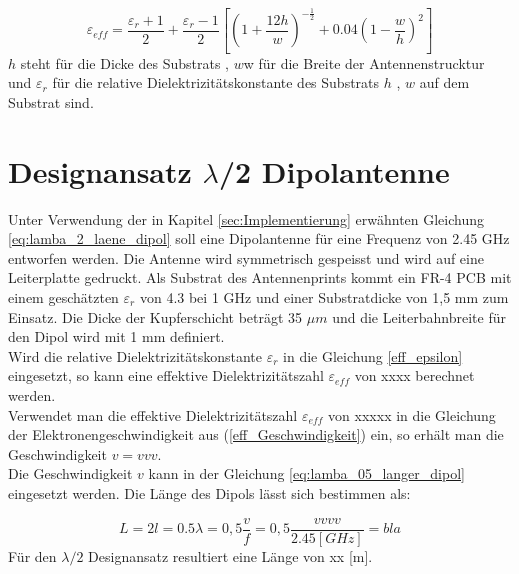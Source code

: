 \begin{equation}\label{eff_epsilon}
\varepsilon_{eff}=\dfrac{\varepsilon_r+1}{2}+\dfrac{\varepsilon_r-1}{2}\left[\left(1+\dfrac{12h}{w}\right)^{-\frac{1}{2}}+0.04\left(1-\dfrac{w}{h}\right)^{2}\right]
\end{equation}
$h$ steht für die Dicke des Substrats , $w$w für die Breite der Antennenstrucktur und  $\varepsilon_{r}$ für die relative Dielektrizitätskonstante des Substrats
$h$ , $w$  auf dem Substrat  sind. 

\section{Designansatz $\lambda$/2 Dipolantenne}  
Unter Verwendung der in Kapitel \ref{sec:Implementierung} erwähnten Gleichung \ref{eq:lamba_2_laene_dipol} soll eine Dipolantenne für eine Frequenz von 2.45 GHz entworfen werden. Die Antenne wird symmetrisch gespeisst und wird auf eine Leiterplatte gedruckt. Als Substrat des Antennenprints kommt ein  FR-4 PCB mit einem geschätzten  $\varepsilon_r $ von 4.3 bei 1 GHz und einer Substratdicke von 1,5 mm  zum Einsatz. Die Dicke der Kupferschicht beträgt 35 $\mu m$ und  die Leiterbahnbreite für den Dipol wird mit 1 mm definiert.\\

Wird die relative Dielektrizitätskonstante $\varepsilon_{r}$ in die Gleichung \ref{eff_epsilon} eingesetzt, so kann eine effektive Dielektrizitätszahl $\varepsilon_{eff}$  von xxxx berechnet werden.\\

Verwendet man die effektive Dielektrizitätszahl $\varepsilon_{eff}$ von xxxxx  in die Gleichung der Elektronengeschwindigkeit aus  (\ref{eff_Geschwindigkeit}) ein, so erhält man die Geschwindigkeit $v=vvv$. \\
Die Geschwindigkeit $v$  kann in der  Gleichung \ref{eq:lamba_05_langer_dipol} eingesetzt werden. Die Länge des Dipols lässt sich bestimmen als:

\begin{equation}\label{eq:lamba_05_langer_dipol}
L=2l = 0.5 \lambda= 0,5\dfrac{v}{f}=0,5 \dfrac{vvvv}{2.45[GHz]}=bla
\end{equation} 
Für den $\lambda/2$ Designansatz resultiert eine Länge von xx [m].
